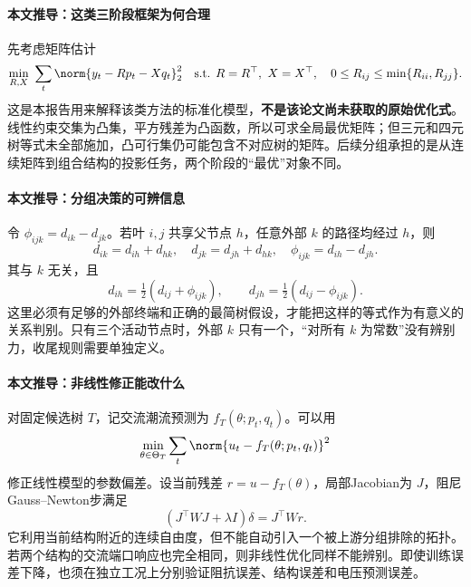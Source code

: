 \paragraph{本文推导：这类三阶段框架为何合理}
先考虑矩阵估计
\begin{equation}
 \min_{R,X}\ \sum_t\norm{y_t-Rp_t-Xq_t}_2^2
 \quad\text{s.t. }R=R^\top,\ X=X^\top,\quad
 0\leq R_{ij}\leq\min\{R_{ii},R_{jj}\}.
 \label{eq:s2-illustrative-qp}
\end{equation}
这是本报告用来解释该类方法的标准化模型，\textbf{不是该论文尚未获取的原始优化式}。线性约束交集为凸集，平方残差为凸函数，所以可求全局最优矩阵；但三元和四元树等式未全部施加，凸可行集仍可能包含不对应树的矩阵。后续分组承担的是从连续矩阵到组合结构的投影任务，两个阶段的“最优”对象不同。

\paragraph{本文推导：分组决策的可辨信息}
令 $\phi_{ijk}=d_{ik}-d_{jk}$。若叶 $i,j$ 共享父节点 $h$，任意外部 $k$ 的路径均经过 $h$，则
\begin{equation}
 d_{ik}=d_{ih}+d_{hk},\quad d_{jk}=d_{jh}+d_{hk},
 \quad\phi_{ijk}=d_{ih}-d_{jh}.
\end{equation}
其与 $k$ 无关，且
\begin{equation}
 d_{ih}=\tfrac12(d_{ij}+\phi_{ijk}),\qquad
 d_{jh}=\tfrac12(d_{ij}-\phi_{ijk}).
\end{equation}
这里必须有足够的外部终端和正确的最简树假设，才能把这样的等式作为有意义的关系判别。只有三个活动节点时，外部 $k$ 只有一个，“对所有 $k$ 为常数”没有辨别力，收尾规则需要单独定义。

\paragraph{本文推导：非线性修正能改什么}
对固定候选树 $T$，记交流潮流预测为 $f_T(\theta;p_t,q_t)$。可以用
\begin{equation}
 \min_{\theta\in\Theta_T}\sum_t\norm{u_t-f_T(\theta;p_t,q_t)}^2
\end{equation}
修正线性模型的参数偏差。设当前残差 $r=u-f_T(\theta)$，局部Jacobian为 $J$，阻尼Gauss--Newton步满足
\begin{equation}
 (J^\top WJ+\lambda I)\delta=J^\top Wr.
\end{equation}
它利用当前结构附近的连续自由度，但不能自动引入一个被上游分组排除的拓扑。若两个结构的交流端口响应也完全相同，则非线性优化同样不能辨别。即使训练误差下降，也须在独立工况上分别验证阻抗误差、结构误差和电压预测误差。

